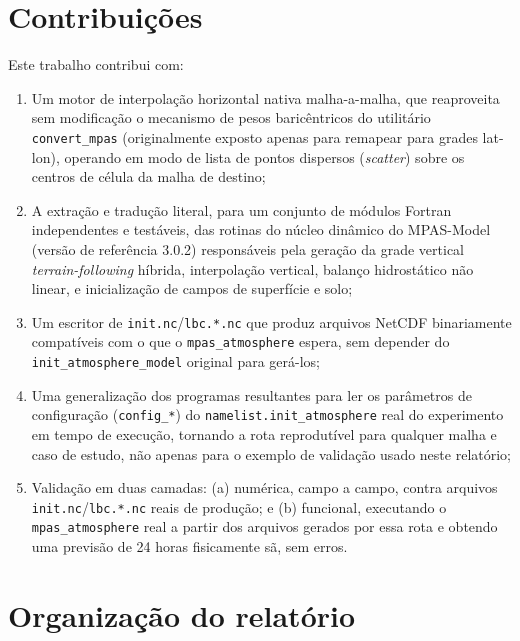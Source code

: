 \section{Contribuições}

Este trabalho contribui com:

\begin{enumerate}[label=(\roman*)]
  \item Um motor de interpolação horizontal nativa malha-a-malha, que
    reaproveita sem modificação o mecanismo de pesos baricêntricos do
    utilitário \texttt{convert\_mpas} (originalmente exposto apenas para
    remapear para grades lat-lon), operando em modo de lista de pontos
    dispersos (\emph{scatter}) sobre os centros de célula da malha de
    destino;
  \item A extração e tradução literal, para um conjunto de módulos
    Fortran independentes e testáveis, das rotinas do núcleo dinâmico do
    MPAS-Model (versão de referência 3.0.2) responsáveis pela geração da
    grade vertical \textit{terrain-following} híbrida, interpolação
    vertical, balanço hidrostático não linear, e inicialização de campos
    de superfície e solo;
  \item Um escritor de \texttt{init.nc}/\texttt{lbc.*.nc} que produz
    arquivos NetCDF binariamente compatíveis com o que o
    \texttt{mpas\_atmosphere} espera, sem depender do
    \texttt{init\_atmosphere\_model} original para gerá-los;
  \item Uma generalização dos programas resultantes para ler os
    parâmetros de configuração (\texttt{config\_*}) do
    \texttt{namelist.init\_atmosphere} real do experimento em tempo de
    execução, tornando a rota reprodutível para qualquer malha e caso de
    estudo, não apenas para o exemplo de validação usado neste relatório;
  \item Validação em duas camadas: (a) numérica, campo a campo, contra
    arquivos \texttt{init.nc}/\texttt{lbc.*.nc} reais de produção; e
    (b) funcional, executando o \texttt{mpas\_atmosphere} real a partir
    dos arquivos gerados por essa rota e obtendo uma previsão de 24 horas
    fisicamente sã, sem erros.
\end{enumerate}

\section{Organização do relatório}

